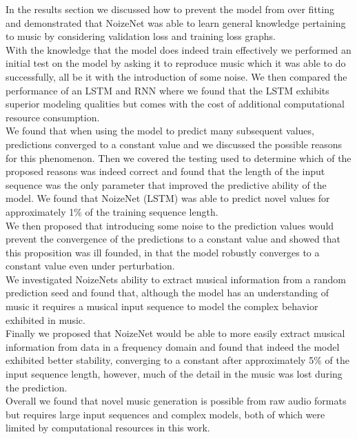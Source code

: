 \documentclass{article}
\begin{document}
In the results section we discussed how to prevent the model from over fitting and demonstrated that NoizeNet was able to learn general knowledge pertaining to music by considering validation loss and training loss graphs. \\
With the knowledge that the model does indeed train effectively we performed an initial test on the model by asking it to reproduce music which it was able to do successfully, all be it with the introduction of some noise. We then compared the performance of an LSTM and RNN where we found that the LSTM exhibits superior modeling qualities but comes with the cost of additional computational resource consumption. \\
We found that when using the model to predict many subsequent values, predictions converged to a constant value and we discussed the possible reasons for this phenomenon. Then we covered the testing used to determine which of the proposed reasons was indeed correct and found that the length of the input sequence was the only parameter that improved the predictive ability of the model. We found that NoizeNet (LSTM) was able to predict novel values for approximately 1\% of the training sequence length. \\
We then proposed that introducing some noise to the prediction values would prevent the convergence of the predictions to a constant value and showed that this proposition was ill founded, in that the model robustly converges to a constant value even under perturbation. \\
We investigated NoizeNets ability to extract musical information from a random prediction seed and found that, although the model has an understanding of music it requires a musical input sequence to model the complex behavior exhibited in music. 
\\
Finally we proposed that NoizeNet would be able to more easily extract musical information from data in a frequency domain and found that indeed the model exhibited better stability, converging to a constant after approximately 5\% of the input sequence length, however, much of the detail in the music was lost during the prediction. 
\\
Overall we found that novel music generation is possible from raw audio formats but requires large input sequences and complex models, both of which were limited by computational resources in this work. 
\printbibliography
\end{document}

